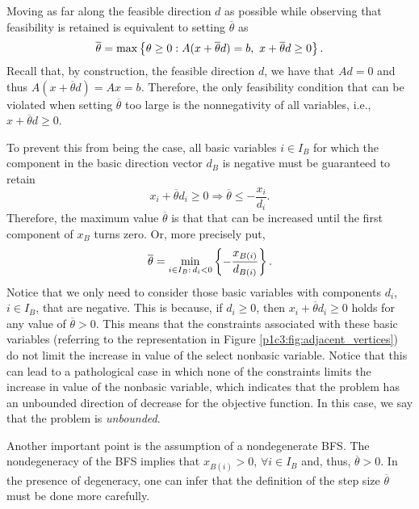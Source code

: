Moving as far along the feasible direction $d$ as possible while observing that feasibility is retained is equivalent to setting $\overline{\theta}$ as 	
%
\begin{equation*}
	\overline{\theta} = \max\left\{ \theta \geq 0 : A(x + \overline{\theta} d) = b, \ x + \overline{\theta}d \geq 0 \right \}.	
\end{equation*}
%
Recall that, by construction, the feasible direction $d$, we have that $Ad = 0$ and thus $A(x + \overline{\theta} d) = Ax = b$. Therefore, the only feasibility condition that can be violated when setting $\overline{\theta}$ too large is the nonnegativity of all variables, i.e., $x + \overline{\theta}d \geq 0$. 

To prevent this from being the case, all basic variables $i \in I_B$ for which the component in the basic direction vector $d_B$ is negative must be guaranteed to retain
%
\begin{equation*}
	x_i + \overline{\theta}d_i \geq 0 \Rightarrow \overline{\theta} \leq -\frac{x_i}{d_i}.
\end{equation*}
%
Therefore, the maximum value $\overline{\theta}$ is that that can be increased until the first component of $x_B$ turns zero. Or, more precisely put, 
%
\begin{equation*}
	\overline{\theta} = \min_{i \in I_B : \, d_i < 0} \left\{ -\frac{x_{B(i)}}{d_{B(i)}} \right \}.
\end{equation*}
%
Notice that we only need to consider those basic variables with components $d_i$, $i \in I_B$, that are negative. This is because, if $d_i \ge 0$, then $x_i + \overline{\theta}d_i \geq 0$ holds for any value of $\overline{\theta} > 0$. This means that the constraints associated with these basic variables (referring to the representation in Figure \ref{p1c3:fig:adjacent_vertices}) do not limit the increase in value of the select nonbasic variable. Notice that this can lead to a pathological case in which none of the constraints limits the increase in value of the nonbasic variable, which indicates that the problem has an unbounded direction of decrease for the objective function. In this case, we say that the problem is \emph{unbounded}.

Another important point is the assumption of a nondegenerate BFS. The nondegeneracy of the BFS implies that  $x_{B(i)} > 0$, $\forall i \in I_B$ and, thus, $\overline{\theta} > 0$. In the presence of degeneracy, one can infer that the definition of the step size $\overline{\theta}$ must be done more carefully.


